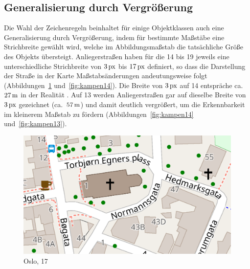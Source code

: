 \documentclass[../main/thesis.tex]{subfiles}
\begin{document}



\subsection{Generalisierung durch Vergrößerung}

Die Wahl der Zeichenregeln beinhaltet für einige Objektklassen auch eine Generalisierung durch Vergrößerung, indem für bestimmte Maßstäbe eine Strichbreite gewählt wird, welche im Abbildungsmaßstab die tatsächliche Größe des Objekts übersteigt. Anliegerstraßen haben für die  14 bis 19 jeweils eine unterschiedliche Strichbreite von $\unit[3]{px}$ bis $\unit[17]{px}$ definiert, so dass die Darstellung der Straße in der Karte Maßstabsänderungen andeutungsweise folgt (Abbildungen~\ref{fig:kampen17} und~\ref{fig:kampen14}). Die Breite von $\unit[3]{px}$ auf  14 entspräche ca.~$\unit[27]{m}$ in der Realität . Auf  13 werden Anliegerstraßen gar auf dieselbe Breite von $\unit[3]{px}$ gezeichnet (ca.~$\unit[57]{m}$) und damit deutlich vergrößert, um die Erkennbarkeit im kleinerem Maßstab zu fördern (Abbildungen~\ref{fig:kampen14} und~\ref{fig:kampen13}).


\begin{figure}[ht]
    \centering
    \includegraphics[width=\ScaleIfNeeded]{../chapter2/kampen-z17}
    \caption{Oslo,  17}\label{fig:kampen17}
\end{figure}
\end{document}
